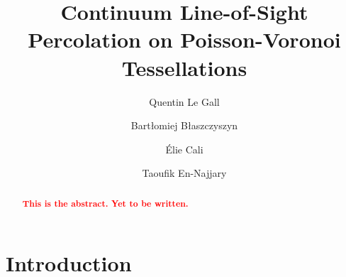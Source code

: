 \documentclass[10pt,a4paper]{amsart}
\theoremstyle{exampstyle}
\theoremstyle{exampnotations}
\begin{document}
\title{Continuum Line-of-Sight Percolation on Poisson-Voronoi Tessellations}
\author[Q. Le Gall]{Quentin Le Gall}
\address{Orange Labs Networks, 44 avenue de la République 92320 Ch\^atillon}
\author[B. B\l{}aszczyszyn] {Bart\l{}omiej B\l{}aszczyszyn}
\address{Inria - \MakeUppercase{ens}, 2 rue Simone Iff CS42112 75589 Paris Cedex 12}
\author[E. Cali]{\'Elie Cali}
\address{Orange Labs Networks, 44 avenue de la République 92320 Ch\^atillon}
\author[T. En-Najjary]{Taoufik En-Najjary}
\address{Orange Labs Networks, 44 avenue de la République 92320 Ch\^atillon}
\maketitle
\tableofcontents

\begin{abstract}
    \textbf{\textcolor{red}{This is the abstract. Yet to be written.}}
\end{abstract}
\section{Introduction}
\end{document}
